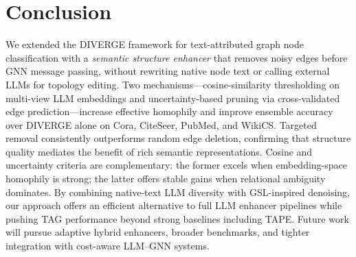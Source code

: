 \section{Conclusion}
\label{sec:conclusion}

We extended the DIVERGE framework for text-attributed graph node classification with a
\emph{semantic structure enhancer} that removes noisy edges before GNN message passing,
without rewriting native node text or calling external LLMs for topology editing. Two
mechanisms---cosine-similarity thresholding on multi-view LLM embeddings and
uncertainty-based pruning via cross-validated edge prediction---increase effective
homophily and improve ensemble accuracy over DIVERGE alone on Cora, CiteSeer, PubMed,
and WikiCS. Targeted removal consistently outperforms random edge deletion, confirming
that structure quality mediates the benefit of rich semantic representations. Cosine and
uncertainty criteria are complementary: the former excels when embedding-space homophily
is strong; the latter offers stable gains when relational ambiguity dominates. By
combining native-text LLM diversity with GSL-inspired denoising, our approach offers an
efficient alternative to full LLM enhancer pipelines while pushing TAG performance
beyond strong baselines including TAPE. Future work will pursue adaptive hybrid
enhancers, broader benchmarks, and tighter integration with cost-aware LLM--GNN systems.






